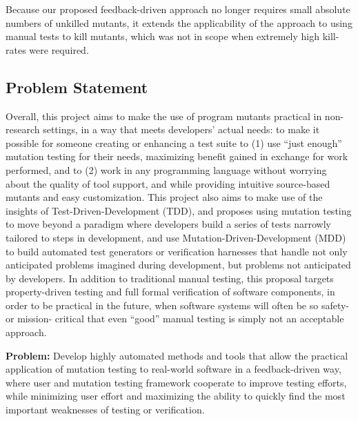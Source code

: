 Because our proposed feedback-driven approach no longer requires small absolute
numbers of unkilled mutants, it extends the applicability of the approach to
using manual tests to kill mutants, which was not in scope when extremely high
kill-rates were required.

\subsection{Problem Statement}

Overall, this project aims to make the use of program mutants practical in
non-research settings, in a way that meets developers' actual needs: to make it
possible for someone creating or enhancing a test suite to (1) use ``just
enough'' mutation testing for their needs, maximizing benefit gained in exchange
for work performed, and to (2) work in any programming language without worrying
about the quality of tool support, and while providing intuitive source-based
mutants and easy customization.  This project also aims to make use of the insights of
Test-Driven-Development (TDD), and proposes using mutation testing to move
beyond a paradigm where developers build a series of tests narrowly tailored to
steps in development, and use Mutation-Driven-Development (MDD) to build
automated test generators or verification harnesses that handle not only
anticipated problems imagined during development, but problems not anticipated
by developers.  In addition to traditional manual testing, this proposal targets
property-driven testing and full formal verification of software components, in
order to be practical in the future, when software systems will often be so
safety- or mission- critical that even ``good'' manual testing is simply not an
acceptable approach. 


\begin{framed} {\bf Problem:} Develop highly automated methods and tools that
  allow the practical application of mutation testing to real-world software in
  a feedback-driven way, where user and mutation testing framework cooperate to
  improve testing efforts, while minimizing user effort and maximizing the
  ability to quickly find the most important weaknesses of testing or
  verification.
\end{framed}



